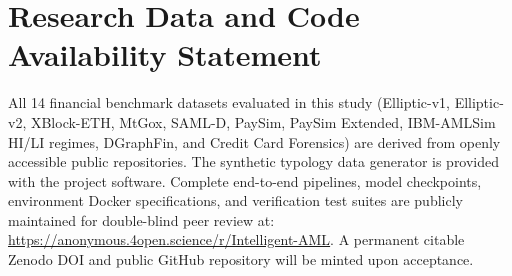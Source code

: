 \documentclass[a4paper,11pt]{article}
\begin{document}
\section*{Research Data and Code Availability Statement}
All 14 financial benchmark datasets evaluated in this study (Elliptic-v1, Elliptic-v2, XBlock-ETH, MtGox, SAML-D, PaySim, PaySim Extended, IBM-AMLSim HI/LI regimes, DGraphFin, and Credit Card Forensics) are derived from openly accessible public repositories. The synthetic typology data generator is provided with the project software. Complete end-to-end pipelines, model checkpoints, environment Docker specifications, and verification test suites are publicly maintained for double-blind peer review at: \url{https://anonymous.4open.science/r/Intelligent-AML}. A permanent citable Zenodo DOI and public GitHub repository will be minted upon acceptance.
\end{document}
